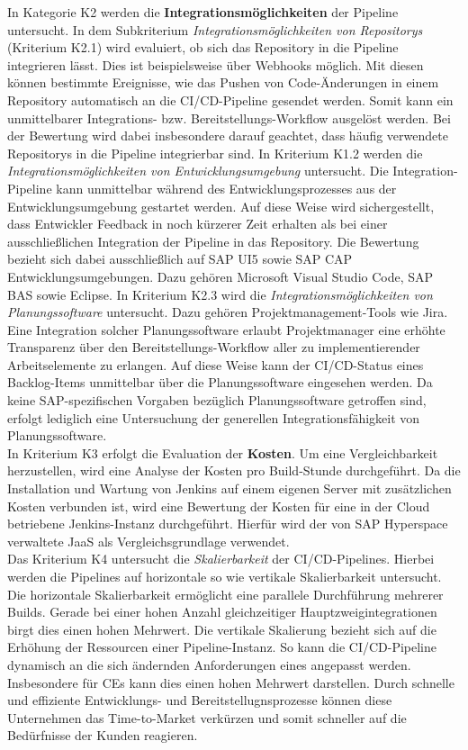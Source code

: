 In Kategorie K2 werden die \textbf{Integrationsmöglichkeiten} der Pipeline untersucht. In dem Subkriterium \textit{Integrationsmöglichkeiten von Repositorys} (Kriterium K2.1) wird evaluiert, ob sich das Repository in die Pipeline integrieren lässt. Dies ist beispielsweise über Webhooks möglich. Mit diesen können bestimmte Ereignisse, wie das Pushen von Code-Änderungen in einem Repository automatisch an die CI/CD-Pipeline gesendet werden. Somit kann ein unmittelbarer Integrations- bzw. Bereitstellungs-Workflow ausgelöst werden. Bei der Bewertung wird dabei insbesondere darauf geachtet, dass häufig verwendete Repositorys in die Pipeline integrierbar sind. In Kriterium K1.2 werden die \textit{Integrationsmöglichkeiten von Entwicklungsumgebung} untersucht. Die Integration-Pipeline kann unmittelbar während des Entwicklungsprozesses aus der Entwicklungsumgebung gestartet werden. Auf diese Weise wird sichergestellt, dass Entwickler Feedback in noch kürzerer Zeit erhalten als bei einer ausschließlichen Integration der Pipeline in das Repository. Die Bewertung bezieht sich dabei ausschließlich auf SAP UI5 sowie SAP CAP Entwicklungsumgebungen. Dazu gehören Microsoft Visual Studio Code, \ac{SAP BAS} sowie Eclipse.
In Kriterium K2.3 wird die \textit{Integrationsmöglichkeiten von Planungssoftware} untersucht. Dazu gehören Projektmanagement-Tools wie Jira. Eine Integration solcher Planungssoftware erlaubt Projektmanager eine erhöhte Transparenz über den Bereitstellungs-Workflow aller zu implementierender Arbeitselemente zu erlangen. Auf diese Weise kann der CI/CD-Status eines Backlog-Items unmittelbar über die Planungssoftware eingesehen werden. Da keine SAP-spezifischen Vorgaben bezüglich Planungssoftware getroffen sind, erfolgt lediglich eine Untersuchung der generellen Integrationsfähigkeit von Planungssoftware.\\ 
In Kriterium K3 erfolgt die Evaluation der \textbf{Kosten}. Um eine Vergleichbarkeit herzustellen, wird eine Analyse der Kosten pro Build-Stunde durchgeführt. Da die Installation und Wartung von Jenkins auf einem eigenen Server mit zusätzlichen Kosten verbunden ist, wird eine Bewertung der Kosten für eine in der Cloud betriebene Jenkins-Instanz durchgeführt. Hierfür wird der von SAP Hyperspace verwaltete \ac{JaaS} als Vergleichsgrundlage verwendet.\\
Das Kriterium K4 untersucht die \textit{Skalierbarkeit} der CI/CD-Pipelines. Hierbei werden die Pipelines auf horizontale so wie vertikale Skalierbarkeit untersucht. Die horizontale Skalierbarkeit ermöglicht eine parallele Durchführung mehrerer Builds. Gerade bei einer hohen Anzahl gleichzeitiger Hauptzweigintegrationen birgt dies einen hohen Mehrwert. Die vertikale Skalierung bezieht sich auf die Erhöhung der Ressourcen einer Pipeline-Instanz. So kann die CI/CD-Pipeline dynamisch an die sich ändernden Anforderungen eines angepasst werden. Insbesondere für  CEs kann dies einen hohen Mehrwert darstellen. Durch schnelle und effiziente Entwicklungs- und Bereitstellugnsprozesse können diese Unternehmen das Time-to-Market verkürzen und somit schneller auf die Bedürfnisse der Kunden reagieren.\\
